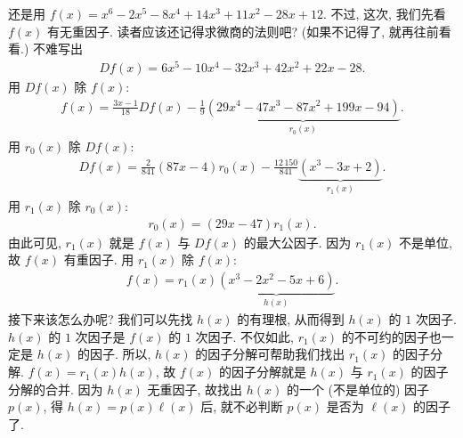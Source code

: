 \begin{example}
    还是用 $f(x) = x^6-2 x^5-8 x^4+14 x^3+11 x^2-28 x+12$. 不过, 这次, 我们先看 $f(x)$ 有无重因子. 读者应该还记得求微商的法则吧? (如果不记得了, 就再往前看看.) 不难写出
    \begin{align*}
        Df(x) = 6 x^5-10 x^4-32 x^3+42 x^2+22 x-28.
    \end{align*}
    用 $Df(x)$ 除 $f(x)$:
    \begin{align*}
        f(x) = \frac{3x-1}{18} Df(x) - \frac{1}{9} \underbrace{(29 x^4-47 x^3-87 x^2+199 x-94)}_{r_0 (x)}.
    \end{align*}
    用 $r_0 (x)$ 除 $Df(x)$:
    \begin{align*}
        Df(x) = \frac{2}{841} (87x-4) r_0 (x) - \frac{12\,150}{841} \underbrace{(x^3-3 x+2)}_{r_1 (x)}.
    \end{align*}
    用 $r_1 (x)$ 除 $r_0 (x)$:
    \begin{align*}
        r_0 (x) = (29x-47) r_1 (x).
    \end{align*}
    由此可见, $r_1 (x)$ 就是 $f(x)$ 与 $Df(x)$ 的最大公因子. 因为 $r_1 (x)$ 不是单位, 故 $f(x)$ 有重因子. 用 $r_1 (x)$ 除 $f(x)$:
    \begin{align*}
        f(x) = r_1 (x) \underbrace{(x^3-2 x^2-5 x+6)}_{h(x)}.
    \end{align*}
    接下来该怎么办呢? 我们可以先找 $h(x)$ 的有理根, 从而得到 $h(x)$ 的 $1$ 次因子. $h(x)$ 的 $1$ 次因子是 $f(x)$ 的 $1$ 次因子. 不仅如此, $r_1 (x)$ 的不可约的因子也一定是 $h(x)$ 的因子. 所以, $h(x)$ 的因子分解可帮助我们找出 $r_1 (x)$ 的因子分解. $f(x) = r_1 (x) h(x)$, 故 $f(x)$ 的因子分解就是 $h(x)$ 与 $r_1 (x)$ 的因子分解的合并. 因为 $h(x)$ 无重因子, 故找出 $h(x)$ 的一个 (不是单位的) 因子 $p(x)$, 得 $h(x) = p(x) \ell(x)$ 后, 就不必判断 $p(x)$ 是否为 $\ell (x)$ 的因子了.


\end{example}
